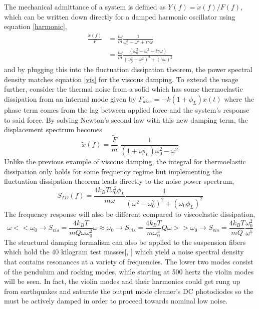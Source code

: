 		The mechanical admittance of a system is defined as $Y(f) = \dot{x}(f)/F(f)$, which can be written down directly for a damped harmonic oscillator using equation \ref{harmonic},
		\begin{equation}
			\begin{aligned}
			\frac{\dot{x}(f)}{F} &= \frac{i \omega}{m} \frac{1}{\omega_{0}^2 - \omega^2 +i\gamma \omega}\\
								 &= \frac{i\omega}{m} \frac{(\omega_{0}^2 - \omega^2 - i \gamma \omega)}{(\omega_0^2 - \omega^2)^2 + (\gamma \omega)^2}
			\end{aligned}
		\end{equation}
		and by plugging this into the fluctuation dissipation theorem, the power spectral density matches equation \ref{vis} for the viscous damping.  To extend the usage further, consider the thermal noise from a solid which has some thermoelastic dissipation from an internal mode given by $F_{diss} = -k(1+\phi_L) x(t) $ where the phase term comes from the lag between applied force and the system's response to said force.  By solving Newton's second law with this new damping term, the displacement spectrum becomes 
		\begin{equation}
		\tilde{x}(f) =  \frac{\tilde{F}}{m} \; \frac{1}{(1 + i\phi_L ) \omega_{0}^2 - \omega^2 }
		\end{equation}
		Unlike the previous example of viscous damping, the integral for thermoelastic dissipation only holds for some frequency regime but implementing the fluctuation dissipation theorem leads directly to the noise power spectrum,
		\begin{equation}
			S_{TD}(f) =  \frac{4k_B T \omega_{0}^2 \phi_L}{m \omega} \frac{1}{(\omega^2 - \omega_{0}^2)^2 + (\omega_{0}\phi_L)^2}
		\end{equation}
		The frequency response will also be different compared to viscoelastic dissipation,
		\begin{subequations}
			\begin{equation}
			\omega<< \omega_{0} \rightarrow S_{vis} = \frac{4k_B T}{m Q \omega \omega_{0}^2}
			\end{equation}
			\begin{equation}
			\omega \approx \omega_{0} \rightarrow S_{vis} = \frac{4k_B T}{m \omega_{0}^3} Q
			\end{equation}
			\begin{equation}
			\omega >> \omega_{0} \rightarrow S_{vis} = \frac{4k_B T}{m Q} \frac{\omega_0^2}{\omega^5} 
			\end{equation}
		\end{subequations}
		The structural damping formalism can also be applied to the suspension fibers which hold the 40 kilogram test masses[\cite{SaulsonThermalSus}, \cite{Saulson}] which yield a noise spectral density that contains resonances at a variety of frequencies.  The lower two modes consist of the pendulum and rocking modes, while starting at 500 hertz the violin modes will be seen.  In fact, the violin modes and their harmonics could get rung up from earthquakes and saturate the output mode cleaner's DC photodiodes so the must be actively damped in order to proceed towards nominal low noise.
		
